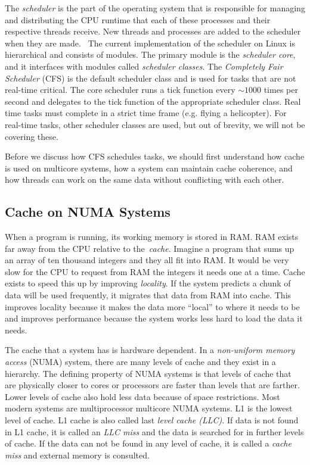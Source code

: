 \documentclass{sig-alternate}
\begin{document}
The \emph{scheduler} is the part of the operating system that is responsible for managing and distributing the CPU runtime that each of these processes and their respective threads receive. New threads and processes are added to the scheduler when they are made.~\cite{Lozi:2016} The current implementation of the scheduler on Linux is hierarchical and consists of modules. The primary module is the \emph{scheduler core}, and it interfaces with modules called \emph{scheduler classes}. The \emph{Completely Fair Scheduler} (CFS) is the default scheduler class and is used for tasks that are not real-time critical. The core scheduler runs a tick function every ${\sim}1000$ times per second and delegates to the tick function of the appropriate scheduler class. Real time tasks must complete in a strict time frame (e.g. flying a helicopter). For real-time tasks, other scheduler classes are used, but out of brevity, we will not be covering these.~\cite{SchedThesis}

Before we discuss how CFS schedules tasks, we should first understand how cache is used on multicore systems, how a system can maintain cache coherence, and how threads can work on the same data without conflicting with each other.

\pagebreak

\subsection{Cache on NUMA Systems}
\label{sec:cache}

When a program is running, its working memory is stored in RAM. RAM exists far away from the CPU relative to the~\emph{cache}. Imagine a program that sums up an array of ten thousand integers and they all fit into RAM. It would be very slow for the CPU to request from RAM the integers it needs one at a time. Cache exists to speed this up by improving \emph{locality}. If the system predicts a chunk of data will be used frequently, it migrates that data from RAM into cache. This improves locality because it makes the data more ``local'' to where it needs to be and improves performance because the system works less hard to load the data it needs.

The cache that a system has is hardware dependent. In a \emph{non-uniform memory access} (NUMA) system, there are many levels of cache and they exist in a hierarchy. The defining property of NUMA systems is that levels of cache that are physically closer to cores or processors are faster than levels that are farther. Lower levels of cache also hold less data because of space restrictions. Most modern systems are multiprocessor multicore NUMA systems. L1 is the lowest level of cache. L1 cache is also called last \emph{level cache (LLC)}. If data is not found in L1 cache, it is called an \emph{LLC miss} and the data is searched for in further levels of cache. If the data can not be found in any level of cache, it is called a \emph{cache miss} and external memory is consulted. 
\end{document}
